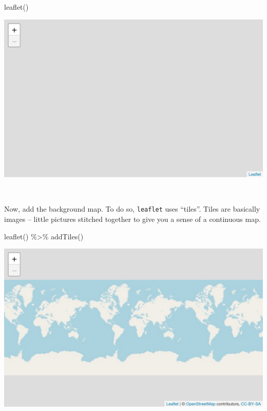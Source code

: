 \documentclass[
]{book}
\newenvironment{Shaded}{\begin{snugshade}}{\end{snugshade}}
\newcommand{\FunctionTok}[1]{\textcolor[rgb]{0.00,0.00,0.00}{#1}}
\newcommand{\NormalTok}[1]{#1}
\newcommand{\SpecialCharTok}[1]{\textcolor[rgb]{0.00,0.00,0.00}{#1}}
\begin{document}
\begin{Shaded}
\begin{Highlighting}[]
\FunctionTok{leaflet}\NormalTok{()}
\end{Highlighting}
\end{Shaded}

\includegraphics{figures/unnamed-chunk-212-1.pdf}

~

Now, add the background map. To do so, \texttt{leaflet} uses ``tiles''. Tiles are basically images -- little pictures stitched together to give you a sense of a continuous map.

\begin{Shaded}
\begin{Highlighting}[]
\FunctionTok{leaflet}\NormalTok{() }\SpecialCharTok{\%\textgreater{}\%} \FunctionTok{addTiles}\NormalTok{() }
\end{Highlighting}
\end{Shaded}

\includegraphics{figures/unnamed-chunk-213-1.pdf}
\end{document}
